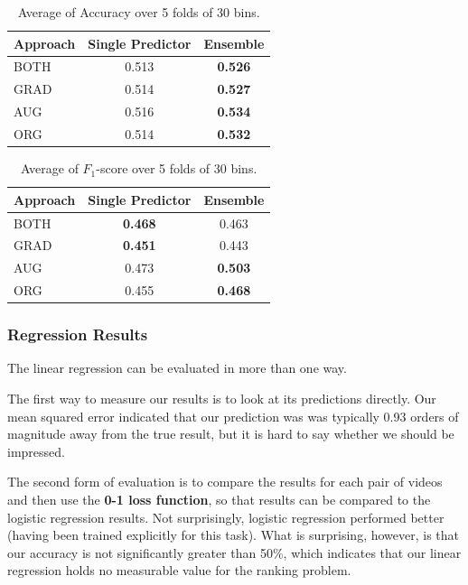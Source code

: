 			\begin{table}[h]
			\caption{Average of Accuracy over 5 folds of 30 bins.}
			\label{tbl:acc}
				\begin{center}
					\begin{tabular}{| l | c | c |}						
					\hline
					Approach & Single Predictor & Ensemble \\ \hline
					BOTH & 0.513 & \textbf{0.526} \\ \hline
					GRAD & 0.514 & \textbf{0.527} \\ \hline
					AUG & 0.516 & \textbf{0.534} \\ \hline
					ORG & 0.514 & \textbf{0.532} \\ \hline		
					\end{tabular}
				\end{center}	
			\end{table}

	\begin{table}[h]
	\caption{Average of $F_1$-score over 5 folds of 30 bins.}
	\label{tbl:f1}
		\begin{center}		
			\begin{tabular}{| l | c | c |}
			\hline
				Approach & Single Predictor & Ensemble \\ \hline
				BOTH & \textbf{0.468} & 0.463 \\ \hline
				GRAD & \textbf{0.451} & 0.443 \\ \hline
				AUG & 0.473 & \textbf{0.503} \\ \hline
				ORG & 0.455 & \textbf{0.468} \\ \hline
			\end{tabular}
		\end{center}
	\end{table}
	
\subsubsection{Regression Results}
	The linear regression can be evaluated in more than one way.
	
	The first way to measure our results is to look at its predictions directly.  Our mean squared error indicated that our prediction was was typically 0.93 orders of magnitude away from the true result, but it is hard to say whether we should be impressed.
	
	The second form of evaluation is to compare the results for each pair of videos and then use the \textbf{0-1 loss function}, so that results can be compared to the logistic regression results.  Not surprisingly, logistic regression performed better (having been trained explicitly for this task).  What is surprising, however, is that our accuracy is not significantly greater than 50\%, which indicates that our linear regression holds no measurable value for the ranking problem.
	
